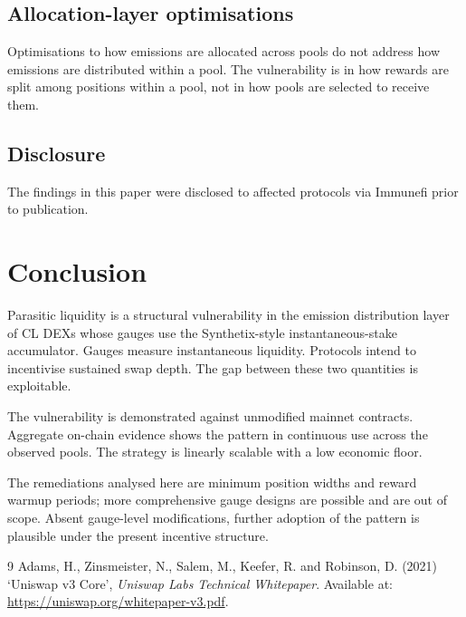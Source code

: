 \documentclass[11pt,a4paper]{article}
\theoremstyle{definition}
\begin{document}
\subsection{Allocation-layer optimisations}\label{sec:allocation}

Optimisations to how emissions are allocated across pools do not address how emissions are distributed within a pool. The vulnerability is in how rewards are split among positions within a pool, not in how pools are selected to receive them.

\subsection{Disclosure}\label{sec:disclosure}

The findings in this paper were disclosed to affected protocols via Immunefi prior to publication.

\section{Conclusion}\label{sec:conclusion}

Parasitic liquidity is a structural vulnerability in the emission distribution layer of CL DEXs whose gauges use the Synthetix-style instantaneous-stake accumulator. Gauges measure instantaneous liquidity. Protocols intend to incentivise sustained swap depth. The gap between these two quantities is exploitable.

The vulnerability is demonstrated against unmodified mainnet contracts. Aggregate on-chain evidence shows the pattern in continuous use across the observed pools. The strategy is linearly scalable with a low economic floor.

The remediations analysed here are minimum position widths and reward warmup periods; more comprehensive gauge designs are possible and are out of scope. Absent gauge-level modifications, further adoption of the pattern is plausible under the present incentive structure.

\begin{thebibliography}{9}
Adams, H., Zinsmeister, N., Salem, M., Keefer, R. and Robinson, D. (2021) `Uniswap v3 Core', \textit{Uniswap Labs Technical Whitepaper}. Available at: \url{https://uniswap.org/whitepaper-v3.pdf}.
\end{thebibliography}

\clearpage
\appendix
\end{document}
